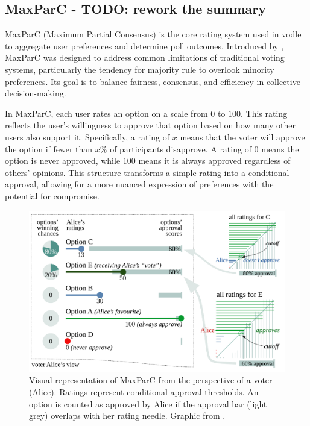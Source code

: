 
\subsection{MaxParC - TODO: rework the summary}
MaxParC (Maximum Partial Consensus) is the core rating system used in vodle to aggregate user preferences and determine poll outcomes. Introduced by \cite{heitzig_fair_2024}, MaxParC was designed to address common limitations of traditional voting systems, particularly the tendency for majority rule to overlook minority preferences. Its goal is to balance fairness, consensus, and efficiency in collective decision-making.

In MaxParC, each user rates an option on a scale from $0$ to $100$. This rating reflects the user's willingness to approve that option based on how many other users also support it. Specifically, a rating of $x$ means that the voter will approve the option if fewer than $x\%$ of participants disapprove. A rating of $0$ means the option is never approved, while $100$ means it is always approved regardless of others' opinions. This structure transforms a simple rating into a conditional approval, allowing for a more nuanced expression of preferences with the potential for compromise.

\begin{figure}[H]
    \centering
    \includegraphics[width=0.8\linewidth]{../common/maxparc.png}
    \caption{Visual representation of MaxParC from the perspective of a voter (Alice). Ratings represent conditional approval thresholds. An option is counted as approved by Alice if the approval bar (light grey) overlaps with her rating needle. Graphic from \cite{heitzig_fair_2024}.}
\end{figure}

